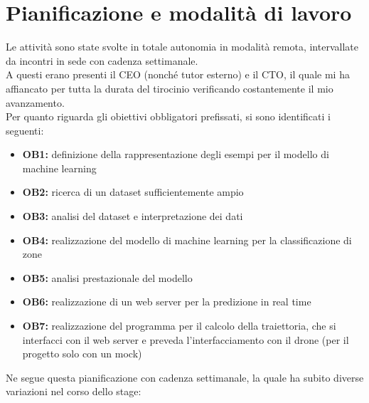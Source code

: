 \section{Pianificazione e modalità di lavoro}
Le attività sono state svolte in totale autonomia in modalità remota, intervallate da incontri in sede con cadenza settimanale.\\
A questi erano presenti il CEO (nonché tutor esterno) e il CTO, il quale mi ha affiancato per tutta la durata del tirocinio verificando
costantemente il mio avanzamento.\\
Per quanto riguarda gli obiettivi obbligatori prefissati, si sono identificati i seguenti:
\begin{itemize}
		\item \textbf{OB1:} definizione della rappresentazione degli esempi per il modello di machine learning
		\item \textbf{OB2:} ricerca di un dataset sufficientemente ampio
		\item \textbf{OB3:} analisi del dataset e interpretazione dei dati
		\item \textbf{OB4:} realizzazione del modello di machine learning per la classificazione di zone
		\item \textbf{OB5:} analisi prestazionale del modello
		\item \textbf{OB6:} realizzazione di un web server per la predizione in real time
		\item \textbf{OB7:} realizzazione del programma per il calcolo della traiettoria, che si interfacci con il web server e preveda l'interfacciamento con il drone (per il progetto solo con un mock)
\end{itemize}
Ne segue questa pianificazione con cadenza settimanale, la quale ha subito diverse variazioni nel corso dello stage:

